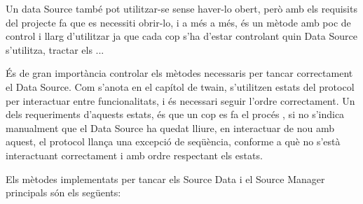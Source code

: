 \documentclass[letterpaper,11pt,catalan]{sphinxmanual}
\begin{document}
Un data Source també pot utilitzar-se sense haver-lo obert, però amb els requisits
del projecte fa que es necessiti obrir-lo, i a més a més, és un mètode amb poc de
control i llarg d'utilitzar ja que cada cop s'ha d'estar controlant quin Data Source
s'utilitza, tractar els ...

\begin{sphinxVerbatim}[commandchars=\\\{\}]
 
  
\PYG{p}{[}\PYG{p}{]}
\end{sphinxVerbatim}

És de gran importància controlar els mètodes necessaris per tancar correctament el Data Source.
Com s'anota en el capítol de twain, s'utilitzen estats del protocol per interactuar entre
funcionalitats, i és necessari seguir l'ordre correctament. Un dels requeriments d'aquests estats,
és que un cop es fa el procés , si no s'indica manualment que el Data Source ha quedat
lliure, en interactuar de nou amb aquest, el protocol llança una excepció de seqüència, conforme
a què no s'està interactuant correctament i amb ordre respectant els estats.

Els mètodes implementats per tancar els Source Data i el Source Manager principals són els següents:

\begin{sphinxVerbatim}[commandchars=\\\{\}]
 
          
          

 
            
            
\end{sphinxVerbatim}
\end{document}
